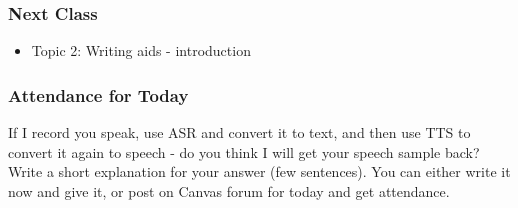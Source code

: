 \documentclass{beamer}
\begin{document}
\begin{frame}
\frametitle{Next Class}
\begin{itemize}
\item Topic 2: Writing aids - introduction %
\end{itemize}
\end{frame}

\begin{frame}
\frametitle{Attendance for Today}
If I record you speak, use ASR and convert it to text, and then use TTS to convert it again to speech - do you think I will get your speech sample back? Write a short explanation for your answer (few sentences). You can either write it now and give it, or post on Canvas forum for today and get attendance.
\end{frame}
\end{document}
